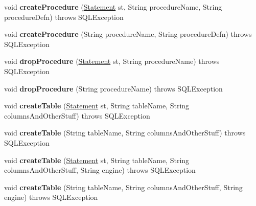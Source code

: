 \begin{DoxyCompactItemize}
void {\bfseries create\+Procedure} (\mbox{\hyperlink{interfacecom_1_1mysql_1_1jdbc_1_1_statement}{Statement}} st, String procedure\+Name, String procedure\+Defn)  throws S\+Q\+L\+Exception 
\item 
\mbox{\label{classtestsuite_1_1_base_test_case_a5d65f7a995144e564691da9ee898406a}} 
void {\bfseries create\+Procedure} (String procedure\+Name, String procedure\+Defn)  throws S\+Q\+L\+Exception 
\item 
\mbox{\label{classtestsuite_1_1_base_test_case_a479da62297639342738924a0c27f88af}} 
void {\bfseries drop\+Procedure} (\mbox{\hyperlink{interfacecom_1_1mysql_1_1jdbc_1_1_statement}{Statement}} st, String procedure\+Name)  throws S\+Q\+L\+Exception 
\item 
\mbox{\label{classtestsuite_1_1_base_test_case_ae81b9c574af66ec9f7af48837aca37fc}} 
void {\bfseries drop\+Procedure} (String procedure\+Name)  throws S\+Q\+L\+Exception 
\item 
\mbox{\label{classtestsuite_1_1_base_test_case_a9b100bed1696694cdede1b8181bdf70a}} 
void {\bfseries create\+Table} (\mbox{\hyperlink{interfacecom_1_1mysql_1_1jdbc_1_1_statement}{Statement}} st, String table\+Name, String columns\+And\+Other\+Stuff)  throws S\+Q\+L\+Exception 
\item 
\mbox{\label{classtestsuite_1_1_base_test_case_afa4c0d18646a12915f111869b2275b87}} 
void {\bfseries create\+Table} (String table\+Name, String columns\+And\+Other\+Stuff)  throws S\+Q\+L\+Exception 
\item 
\mbox{\label{classtestsuite_1_1_base_test_case_a16751e4f9c11d900e1d37e7f073950cd}} 
void {\bfseries create\+Table} (\mbox{\hyperlink{interfacecom_1_1mysql_1_1jdbc_1_1_statement}{Statement}} st, String table\+Name, String columns\+And\+Other\+Stuff, String engine)  throws S\+Q\+L\+Exception 
\item 
\mbox{\label{classtestsuite_1_1_base_test_case_a46f784bec92e5fb4b4c8fcdb7817c4b3}} 
void {\bfseries create\+Table} (String table\+Name, String columns\+And\+Other\+Stuff, String engine)  throws S\+Q\+L\+Exception 

\end{DoxyCompactItemize}
